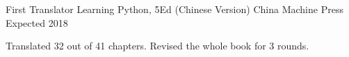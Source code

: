 


\begin{cventries}


\cventry
{First Translator} %
{Learning Python, 5Ed (Chinese Version)} %
{China Machine Press} %
{Expected 2018} %
{ %
\begin{cvitems}
\item {Translated 32 out of 41 chapters. Revised the whole book for 3 rounds.}
\end{cvitems}
}

\end{cventries}
